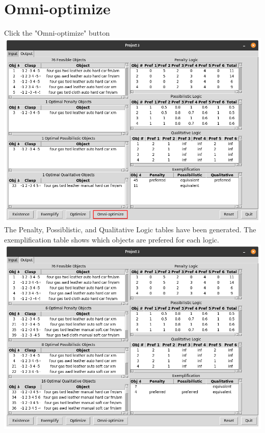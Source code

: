 \documentclass[12pt]{report}
\begin{document}
\section{Omni-optimize} Click the "Omni-optimize" button\\
\includegraphics[scale=0.3]{omni-optimize}\\
The Penalty, Possiblistic, and Qualitative Logic tables have been generated. The exemplification table shows which objects are prefered for each logic.\\
\includegraphics[scale=0.3]{post_omni-optimize}
\end{document}
